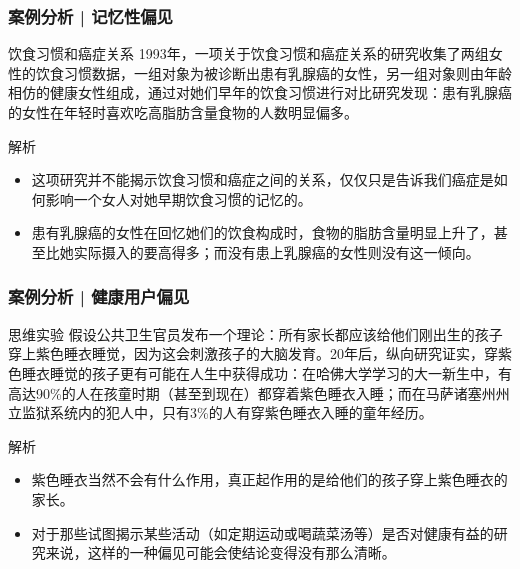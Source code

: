 \begin{frame}
  \frametitle{案例分析 | 记忆性偏见}
  \begin{block}{饮食习惯和癌症关系}
    1993年，一项关于饮食习惯和癌症关系的研究收集了两组女性的饮食习惯数据，一组对象为被诊断出患有乳腺癌的女性，另一组对象则由年龄相仿的健康女性组成，通过对她们早年的饮食习惯进行对比研究发现：患有乳腺癌的女性在年轻时喜欢吃高脂肪含量食物的人数明显偏多。
  \end{block}
  \pause
  \begin{block}{解析}
    \begin{itemize}
      \item 这项研究并不能揭示饮食习惯和癌症之间的关系，仅仅只是告诉我们癌症是如何影响一个女人对她早期饮食习惯的记忆的。
      \item 患有乳腺癌的女性在回忆她们的饮食构成时，食物的脂肪含量明显上升了，甚至比她实际摄入的要高得多；而没有患上乳腺癌的女性则没有这一倾向。
    \end{itemize}
  \end{block}
\end{frame}

\begin{frame}
  \frametitle{案例分析 | 健康用户偏见}
   \begin{block}{思维实验}
     假设公共卫生官员发布一个理论：所有家长都应该给他们刚出生的孩子穿上紫色睡衣睡觉，因为这会刺激孩子的大脑发育。20年后，纵向研究证实，穿紫色睡衣睡觉的孩子更有可能在人生中获得成功：在哈佛大学学习的大一新生中，有高达90\%的人在孩童时期（甚至到现在）都穿着紫色睡衣入睡；而在马萨诸塞州州立监狱系统内的犯人中，只有3\%的人有穿紫色睡衣入睡的童年经历。
   \end{block} 
   \pause
   \begin{block}{解析}
     \begin{itemize}
       \item 紫色睡衣当然不会有什么作用，真正起作用的是给他们的孩子穿上紫色睡衣的家长。
       \item 对于那些试图揭示某些活动（如定期运动或喝蔬菜汤等）是否对健康有益的研究来说，这样的一种偏见可能会使结论变得没有那么清晰。
     \end{itemize}
   \end{block}
\end{frame}

